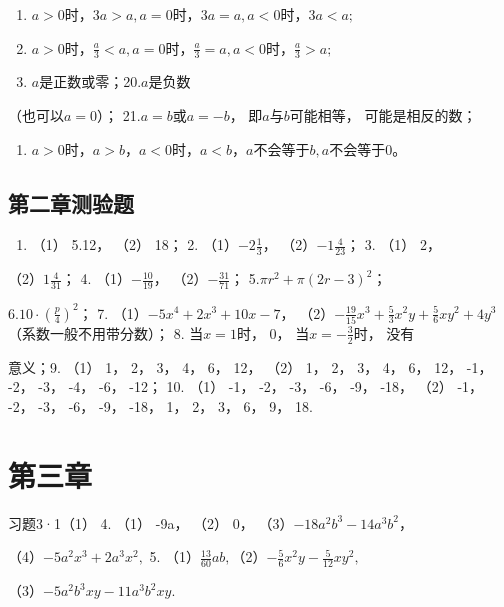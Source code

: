 \begin{enumerate}[start=17]
\item
  \(a > 0\)时，\(3a > a, a = 0\)时，\(3a = a, a < 0\)时，\(3a < a;\)
\item
  \(a > 0\)时，\(\frac{a}{3} < a, a = 0\)时，\(\frac{a}{3} = a, a < 0\)时，\(\frac{a}{3} > a;\)
\item
  \(a\)是正数或零；20.\(a\)是负数
\end{enumerate}

（也可以\(a = 0\)）； 21.\(a = b\)或\(a = -b\)，
即\(a\)与\(b\)可能相等， 可能是相反的数；
\begin{enumerate}[start=22]
\item
  \(a > 0\)时，\(a > b\)，\(a < 0\)时，\(a < b\)，\(a\)不会等于\(b, a\)不会等于\(0\)。
\end{enumerate}

\subsection{第二章测验题}

\begin{enumerate}
\item
  （1） 5.12， （2） 18； 2. （1）\(-2\frac{1}{3}\)，
  （2）\(-1\frac{4}{23}\)； 3. （1） 2，
\end{enumerate}

（2）\(1\frac{4}{31}\)； 4. （1）\(-\frac{10}{19}\)，
（2）\(-\frac{31}{71}\)； 5.\(\pi r^{2} + \pi(2r - 3)^{2}\)；

6.\(10 \cdot \left(\frac{p}{4}\right)^2\)； 7.
（1）\(-5x^4 + 2x^3 + 10x - 7\)，
（2）\(-\frac{19}{15}x^3 + \frac{5}{3}x^2y + \frac{5}{6}xy^2 + 4y^3\)（系数一般不用带分数）；
8. 当\(x = 1\)时， 0， 当\(x = -\frac{3}{2}\)时， 没有

意义；9. （1） 1， 2， 3， 4， 6， 12， （2） 1， 2， 3， 4， 6， 12，
-1， -2， -3， -4， -6， -12； 10. （1） -1， -2， -3， -6， -9， -18，
（2） -1， -2， -3， -6， -9， -18， 1， 2， 3， 6， 9， 18.

\section{第三章}

习题3·1（1） 4. （1） -9a， （2） 0，
（3）\(-18a^{2}b^{3} - 14a^{3}b^{2}\)，

（4）\(-5a^{2}x^{3} + 2a^{3}x^{2},\) 5.
（1）\(\frac{13}{60} a b,\)（2）\(-\frac{5}{6} x^{2}y - \frac{5}{12} xy^{2},\)

（3）\(-5a^{2}b^{3}xy - 11a^{3}b^{2}xy.\)

